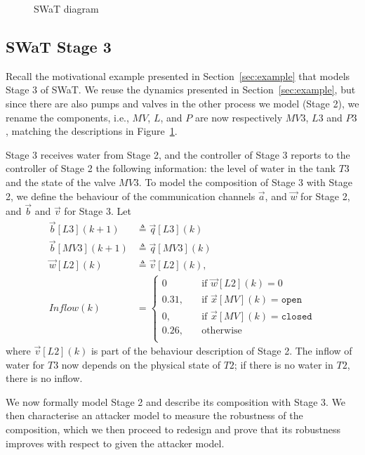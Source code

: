 {\begin{figure}[htb]
    \caption{SWaT diagram}
  \label{fig:SWaTSchema}
\end{figure}

\subsection{SWaT Stage 3}
Recall the motivational example presented in Section~\ref{sec:example} that models Stage 3 of SWaT. We reuse the dynamics presented in Section~\ref{sec:example}, but since there are also pumps and valves in the other process we model (Stage 2), we rename the components, i.e., $MV$, $L$, and $P$ are now respectively $MV3$, $L3$ and $P3$, matching the descriptions in Figure~\ref{fig:SWaTSchema}.

Stage 3 receives water from Stage 2, and the controller of Stage 3 reports to the controller of Stage 2 the following information: the level of water in the tank $T3$ and the state of the valve $MV3$. To model the composition of Stage 3 with Stage 2, we define the behaviour of the communication channels $\vec{a}$, and $\vec{w}$ for Stage 2, and $\vec{b}$ and $\vec{v}$ for Stage 3. Let  
\begin{align}
  \vec{b}[L3](k+1)&\triangleq \vec{q}[L3](k)\\
  \vec{b}[MV3](k+1)&\triangleq \vec{q}[MV3](k)\\
  \vec{w}[L2](k)&\triangleq \vec{v}[L2](k),\\
  Inflow(k)&=\begin{cases}
    0 & \quad \text{if $\vec{w}[L2](k)=0$}\\
    0.31,&\quad \text{if $\vec{x}[MV](k)=\texttt{open}$}\\
    0,&\quad \text{if $\vec{x}[MV](k)=\texttt{closed}$}\\
    0.26,&\quad \text{otherwise}\\
  \end{cases}
\end{align}
where $\vec{v}[L2](k)$ is part of the behaviour description of Stage 2. The inflow of water for $T3$ now depends on the physical state of $T2$; if there is no water in $T2$, there is no inflow.

We now formally model Stage 2 and describe its composition with Stage 3. We then characterise an attacker model to measure the robustness of the composition, which we then proceed to redesign and prove that its robustness improves with respect to given the attacker model.

}
